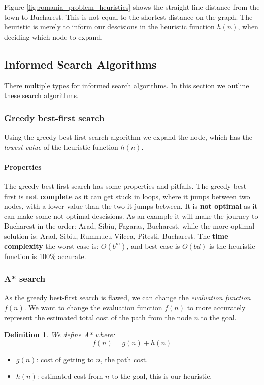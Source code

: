 \documentclass{article}
\newtheorem{definition}{Definition}[section]
\begin{document}
Figure \ref{fig:romania_problem_heuristics} shows the straight line distance
from the town to Bucharest. This is not equal to the shortest distance on the
graph. The heuristic is merely to inform our descisions in the heuristic
function $h(n)$, when deciding which node to expand.



\subsection{Informed Search Algorithms}%
\label{sub:informed_search_algorithms}

There multiple types for informed search algorithms. In this section we outline
these search algorithms.

\subsubsection{Greedy best-first search}%
\label{ssub:greedy_best_first_search}
Using the greedy best-first search algorithm we expand the node, which has the
\emph{lowest value} of the heuristic function $h(n)$.

\paragraph{Properties}%
\label{par:properties}

The greedy-best first search has some properties and pitfalls. The greedy
best-first is \textbf{not complete} as it can get stuck in loops, where it jumps
between two nodes, with a lower value than the two it jumps between. It is
\textbf{not optimal} as it can make some not optimal descisions. As an example
it will make the journey to Bucharest in the order: Arad, Sibiu, Fagaras,
Bucharest, while the more optimal solution is: Arad, Sibiu, Rummucu Vilcea,
Pitesti, Bucharest. The \textbf{time complexity}  the worst case is: $O(b^m)$,
and best case is $O(bd)$ is the heuristic function is 100\% accurate\cite[p.
12]{presentation:informed_search}.

\subsubsection{A* search}%
\label{ssub:a_search}

As the greedy best-first search is flawed, we can change the \emph{evaluation
function} $f(n)$. We want to change the evaluation function $f(n)$ to more
accurately represent the estimated total cost of the path from the node $n$ to
the goal.
\begin{definition}
  We define A* where:
  $$f(n) = g(n) + h(n)$$
\end{definition}
\begin{itemize}
  \item $g(n)$: cost of getting to $n$, the path cost.
  \item $h(n)$: estimated cost from $n$ to the goal, this is our heuristic.
\end{itemize}
\end{document}
